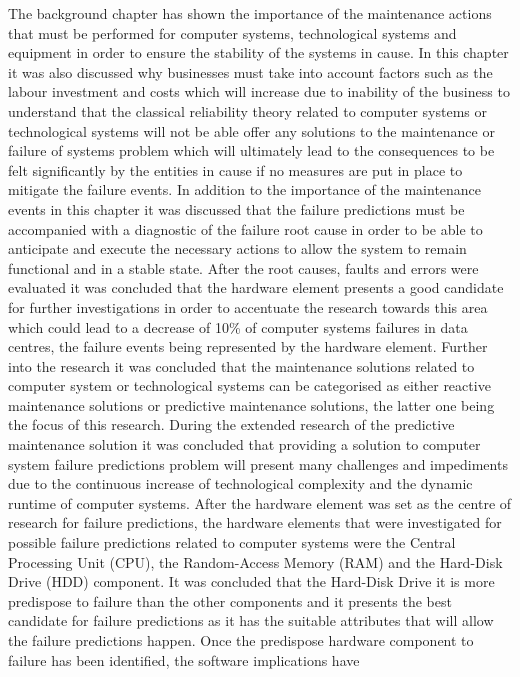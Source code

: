 The background chapter has shown the importance of the maintenance actions that must be performed for computer
systems, technological systems and equipment in order to ensure the stability of the systems in cause. In this
chapter it was also discussed why businesses must take into account factors such as the labour investment and
costs which will increase due to inability of the business to understand that the classical reliability theory
related to computer systems or technological systems will not be able offer any solutions to the maintenance
or failure of systems problem which will ultimately lead to the consequences to be felt significantly by the
entities in cause if no measures are put in place to mitigate the failure events. In addition to the importance
of the maintenance events in this chapter it was discussed that the failure predictions must be accompanied
with a diagnostic of the failure root cause in order to be able to anticipate and execute the necessary actions
to allow the system to remain functional and in a stable state. After the root causes, faults and errors were
evaluated it was concluded that the hardware element presents a good candidate for further investigations in
order to accentuate the research towards this area which could lead to a decrease of 10\% of computer systems
failures in data centres, the failure events being represented by the hardware element. Further into the research
it was concluded that the maintenance solutions related to computer system or technological systems can be
categorised as either reactive maintenance solutions or predictive maintenance solutions, the latter one being
the focus of this research. During the extended research of the predictive maintenance solution it was concluded
that providing a solution to computer system failure predictions problem will present many challenges and
impediments due to the continuous increase of technological complexity and the dynamic runtime of computer
systems. After the hardware element was set as the centre of research for failure predictions, the hardware
elements that were investigated for possible failure predictions related to computer systems were the Central
Processing Unit (CPU), the Random-Access Memory (RAM) and the Hard-Disk Drive (HDD) component. It was concluded
that the Hard-Disk Drive it is more predispose to failure than the other components and it presents the best
candidate for failure predictions as it has the suitable attributes that will allow the failure predictions
happen. Once the predispose hardware component to failure has been identified, the software implications have
